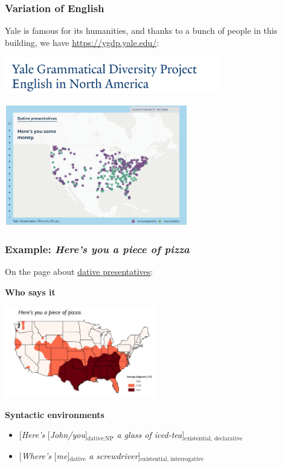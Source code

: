 \documentclass{beamer}
\newcommand{\corpus}[1]{\emph{#1}}
\begin{document}
\begin{frame}
\frametitle{Variation of English}

Yale is famous for its humanities,
and thanks to a bunch of people in this building,
we have \href{https://ygdp.yale.edu/}{https://ygdp.yale.edu/}: 

\begin{center}
    \includegraphics[width=0.7\textwidth]{pics/yale-grammar-variation-logl.PNG}
\end{center}

\begin{center}
    \includegraphics[width=0.6\textwidth]{pics/yale-grammar-map-1.PNG}
\end{center}

\end{frame}

\begin{frame}
\frametitle{Example: \corpus{Here's you a piece of pizza}}

On the page about \href{https://ygdp.yale.edu/phenomena/dative-presentatives}{dative presentatives}:

\textbf{Who says it}

\begin{center}
    \includegraphics[width=0.5\textwidth]{maps/here-is-you-a-piece-of-pizza.PNG}
\end{center}    

\textbf{Syntactic environments}

\begin{itemize}
    \item {[\corpus{Here's} [\corpus{John/you}]$_{\text{dative:NP}}$ \corpus{a glass of iced-tea}]$_{\text{existential, declarative}}$} 
    \item {[\corpus{Where's} [\corpus{me}]$_{\text{dative}}$ \corpus{a screwdriver}]$_{\text{existential, interrogative}}$}
\end{itemize}

\end{frame}
\end{document}
